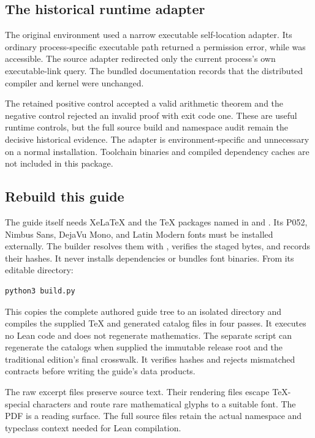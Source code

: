 \subsection{The historical runtime adapter}
The original environment used a narrow executable self-location adapter. Its ordinary process-specific executable path returned a permission error, while  was accessible. The source adapter redirected only the current process's own executable-link query. The bundled documentation records that the distributed compiler and kernel were unchanged.

The retained positive control accepted a valid arithmetic theorem and the negative control rejected an invalid proof with exit code one. These are useful runtime controls, but the full source build and namespace audit remain the decisive historical evidence. The adapter is environment-specific and unnecessary on a normal installation. Toolchain binaries and compiled dependency caches are not included in this package.

\subsection{Rebuild this guide}
The guide itself needs XeLaTeX and the TeX packages named in  and . Its P052, Nimbus Sans, DejaVu Mono, and Latin Modern fonts must be installed externally. The builder resolves them with , verifies the staged bytes, and records their hashes. It never installs dependencies or bundles font binaries. From its editable directory:
\begin{Verbatim}[fontsize=\small,frame=leftline,breaklines=true]
python3 build.py
\end{Verbatim}
This copies the complete authored guide tree to an isolated directory and compiles the supplied TeX and generated catalog files in four passes. It executes no Lean code and does not regenerate mathematics. The separate  script can regenerate the catalogs when supplied the immutable release root and the traditional edition's final crosswalk. It verifies hashes and rejects mismatched contracts before writing the guide's data products.

The raw excerpt files preserve source text. Their rendering files escape TeX-special characters and route rare mathematical glyphs to a suitable font. The PDF is a reading surface. The full source files retain the actual namespace and typeclass context needed for Lean compilation.

